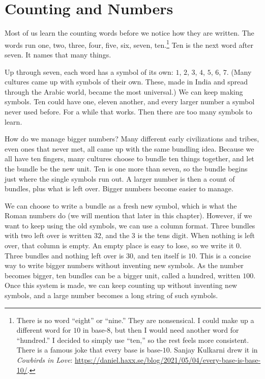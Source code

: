 \chapter{Counting and Numbers}
\label{ch:numbers}

Most of us learn the counting words before we notice how they are written. The words run one, two, three, four, five, six, seven, ten.\footnote{There is no word ``eight'' or ``nine.'' They are nonsensical. I could make up a different word for $10$ in base-8, but then I would need another word for ``hundred.'' I decided to simply use ``ten,'' so the rest feels more consistent. There is a famous joke that every base is base-$10$. Sanjay Kulkarni drew it in \emph{Cowbirds in Love}: \url{https://daniel.haxx.se/blog/2021/05/04/every-base-is-base-10/}.} Ten is the next word after seven. It names that many things.

Up through seven, each word has a symbol of its own: $1$, $2$, $3$, $4$, $5$, $6$, $7$. (Many cultures came up with symbols of their own. These, made in India and spread through the Arabic world, became the most universal.) We can keep making symbols. Ten could have one, eleven another, and every larger number a symbol never used before. For a while that works. Then there are too many symbols to learn.

How do we manage bigger numbers? Many different early civilizations and tribes, even ones that never met, all came up with the same bundling idea. Because we all have ten fingers, many cultures choose to bundle ten things together, and let the bundle be the new unit. Ten is one more than seven, so the bundle begins just where the single symbols run out. A larger number is then a count of bundles, plus what is left over. Bigger numbers become easier to manage.

We can choose to write a bundle as a fresh new symbol, which is what the Roman numbers do (we will mention that later in this chapter). However, if we want to keep using the old symbols, we can use a column format. Three bundles with two left over is written $32$, and the $3$ is the tens digit. When nothing is left over, that column is empty. An empty place is easy to lose, so we write it $0$. Three bundles and nothing left over is $30$, and ten itself is $10$. This is a concise way to write bigger numbers without inventing new symbols. As the number becomes bigger, ten bundles can be a bigger unit, called a hundred, written $100$. Once this system is made, we can keep counting up without inventing new symbols, and a large number becomes a long string of such symbols.

